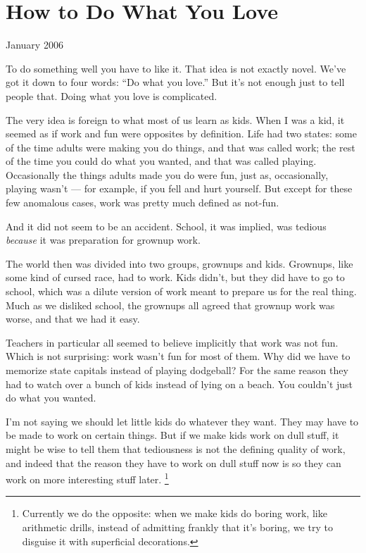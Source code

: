 \chapter{How to Do What You Love}

January 2006

To do something well you have to like it. That idea is not exactly
novel. We've got it down to four words: ``Do what you love.'' But it's
not enough just to tell people that. Doing what you love is complicated.

The very idea is foreign to what most of us learn as kids. When I was a
kid, it seemed as if work and fun were opposites by definition. Life had
two states: some of the time adults were making you do things, and that
was called work; the rest of the time you could do what you wanted, and
that was called playing. Occasionally the things adults made you do were
fun, just as, occasionally, playing wasn't --- for example, if you fell
and hurt yourself. But except for these few anomalous cases, work was
pretty much defined as not-fun.

And it did not seem to be an accident. School, it was implied, was
tedious \emph{because} it was preparation for grownup work.

The world then was divided into two groups, grownups and kids. Grownups,
like some kind of cursed race, had to work. Kids didn't, but they did
have to go to school, which was a dilute version of work meant to
prepare us for the real thing. Much as we disliked school, the grownups
all agreed that grownup work was worse, and that we had it easy.

Teachers in particular all seemed to believe implicitly that work was
not fun. Which is not surprising: work wasn't fun for most of them. Why
did we have to memorize state capitals instead of playing dodgeball? For
the same reason they had to watch over a bunch of kids instead of lying
on a beach. You couldn't just do what you wanted.

I'm not saying we should let little kids do whatever they want. They may
have to be made to work on certain things. But if we make kids work on
dull stuff, it might be wise to tell them that tediousness is not the
defining quality of work, and indeed that the reason they have to work
on dull stuff now is so they can work on more interesting stuff later.
\footnote{Currently we do the opposite: when we make kids do boring work,
like arithmetic drills, instead of admitting frankly that it's boring,
we try to disguise it with superficial decorations.}

